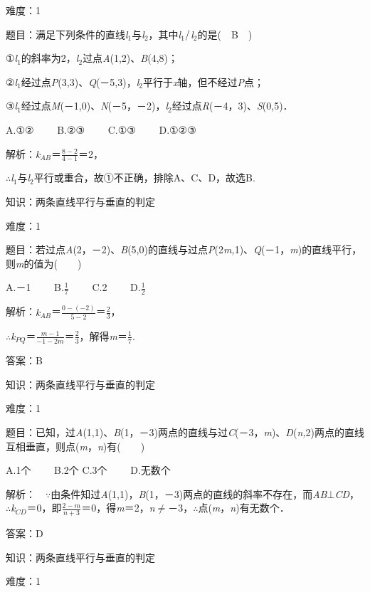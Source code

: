 \documentclass{article} %
\begin{document}
难度：1

题目：满足下列条件的直线\textit{l}${}_{1}$与\textit{l}${}_{2}$，其中\textit{l}${}_{1}$$\mathrm{\//}$\textit{l}${}_{2}$的是(　B　)

①\textit{l}${}_{1}$的斜率为2，\textit{l}${}_{2}$过点\textit{A}(1,2)、\textit{B}(4,8)；

②\textit{l}${}_{1}$经过点\textit{P}(3,3)、\textit{Q}(－5,3)，\textit{l}${}_{2}$平行于\textit{x}轴，但不经过\textit{P}点；

③\textit{l}${}_{1}$经过点\textit{M}(－1,0)、\textit{N}(－5，－2)，\textit{l}${}_{2}$经过点\textit{R}(－4，3)、\textit{S}(0,5)．

A.①②　　 B.②③　　 C.①③　　 D.①②③

解析：\textit{k${}_{AB}$}＝$\frac{8-2}{4-1}$＝2，

$\mathrm{\therefore}$\textit{l}${}_{1}$与\textit{l}${}_{2}$平行或重合，故①不正确，排除A、C、D，故选B.

知识：两条直线平行与垂直的判定

难度：1

题目：若过点\textit{A}(2，－2)、\textit{B}(5,0)的直线与过点\textit{P}(2\textit{m,}1)、\textit{Q}(－1，\textit{m})的直线平行，则\textit{m}的值为(　　)

A.－1　　 B.$\frac{1}{7}$　　 C.2　　 D.$\frac{1}{2}$

解析：\textit{k${}_{AB}$}＝$\frac{0-(-2)}{5-2}$＝$\frac{2}{3}$，

$\mathrm{\therefore}$\textit{k${}_{PQ}$}＝$\frac{m-1}{-1-2m}$＝$\frac{2}{3}$，解得\textit{m}＝$\frac{1}{7}$.

答案：B

知识：两条直线平行与垂直的判定

难度：1

题目：已知，过\textit{A}(1,1)、\textit{B}(1，－3)两点的直线与过\textit{C}(－3，\textit{m})、\textit{D}(\textit{n,}2)两点的直线互相垂直，则点(\textit{m}，\textit{n})有(　　)

A.1个　　 B.2个 C.3个　　 D.无数个

解析：　$\mathrm{\because}$由条件知过\textit{A}(1,1)，\textit{B}(1，－3)两点的直线的斜率不存在，而\textit{AB}$\mathrm{\bot}$\textit{CD}，$\mathrm{\therefore}$\textit{k${}_{CD}$}＝0，即$\frac{2-m}{n+3}$＝0，得\textit{m}＝2，\textit{n}$\mathrm{\neq}$－3，$\mathrm{\therefore}$点(\textit{m}，\textit{n})有无数个．

答案：D

知识：两条直线平行与垂直的判定

难度：1
\end{document}

